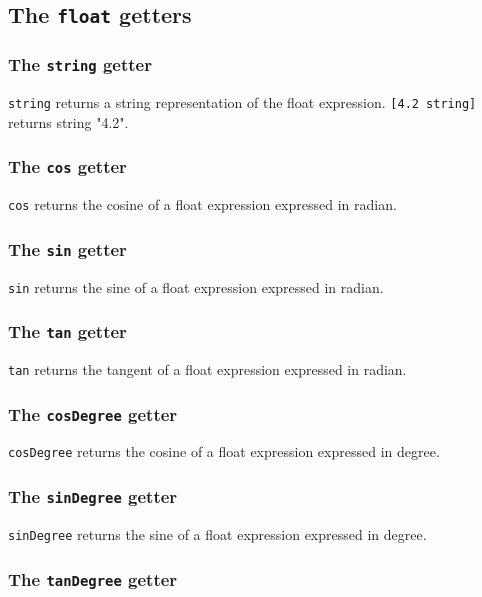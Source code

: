 \documentclass[10pt,openright,twosides]{report}
\newcommand{\scst}[1]{{\footnotesize\ttfamily\colorbox{light-blue}{"#1"}}}
\newcommand{\gtlinline}[1]{\colorbox{light-blue}{\lstinline[language=gtl]{#1}}}
\begin{document}
\subsection{The \texttt{float} getters}

\subsubsection{The \texttt{string} getter}

\gtlinline{string} returns a string representation of the float expression. \gtlinline{[4.2 string]} returns string \scst{4.2}.
  
\subsubsection{The \texttt{cos} getter}

\gtlinline{cos} returns the cosine of a float expression expressed in radian.

\subsubsection{The \texttt{sin} getter}

\gtlinline{sin} returns the sine of a float expression expressed in radian.

\subsubsection{The \texttt{tan} getter}

\gtlinline{tan} returns the tangent of a float expression expressed in radian.

\subsubsection{The \texttt{cosDegree} getter}

\gtlinline{cosDegree} returns the cosine of a float expression expressed in degree.

\subsubsection{The \texttt{sinDegree} getter}

\gtlinline{sinDegree} returns the sine of a float expression expressed in degree.

\subsubsection{The \texttt{tanDegree} getter}
\end{document}
